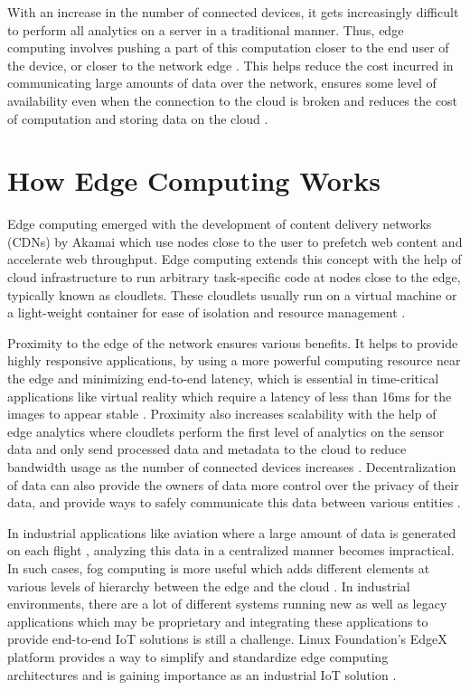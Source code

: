 \documentclass[sigconf]{acmart}
\begin{document}
With an increase in the number of connected devices, it gets increasingly difficult to perform all analytics on a server in a traditional manner. Thus, edge computing involves pushing a part of this computation closer to the end user of the device, or closer to the network edge \cite{wiki-edge-computing}\cite{ibm-iot-edge}. This helps reduce the cost incurred in communicating large amounts of data over the network, ensures some level of availability even when the connection to the cloud is broken and reduces the cost of computation and storing data on the cloud \cite{ieee-iot-cloud-analytics-newsletter}\cite{ibm-iot-edge}.

\section{How Edge Computing Works}
Edge computing emerged with the development of content delivery networks (CDNs) by Akamai which use nodes close to the user to prefetch web content and accelerate web throughput. Edge computing extends this concept with the help of cloud infrastructure to run arbitrary task-specific code at nodes close to the edge, typically known as cloudlets. These cloudlets usually run on a virtual machine or a light-weight container for ease of isolation and resource management \cite{satyanarayananemergence}.

Proximity to the edge of the network ensures various benefits. It helps to provide highly responsive applications, by using a more powerful computing resource near the edge and minimizing end-to-end latency, which is essential in time-critical applications like virtual reality which require a latency of less than 16ms for the images to appear stable \cite{rocket-real-time-video}\cite{satyanarayananemergence}. Proximity also increases scalability with the help of edge analytics where cloudlets perform the first level of analytics on the sensor data and only send processed data and metadata to the cloud to reduce bandwidth usage as the number of connected devices increases \cite{satyanarayananemergence}.  Decentralization of data can also provide the owners of data more control over the privacy of their data, and provide ways to safely communicate this data between various entities \cite{ibm-iot-edge}\cite{FADES-offloading}.

In industrial applications like aviation where a large amount of data is generated on each flight \cite{satyanarayananemergence}, analyzing this data in a centralized manner becomes impractical. In such cases, fog computing is more useful which adds different elements at various levels of hierarchy between the edge and the cloud \cite{rt-insights-iiot}. In industrial environments, there are a lot of different systems running new as well as legacy applications which may be proprietary and integrating these applications to provide end-to-end IoT solutions is still a challenge. Linux Foundation's EdgeX platform provides a way to simplify and standardize edge computing architectures and is gaining importance as an industrial IoT solution \cite{rt-insights-iiot}.
\end{document}
